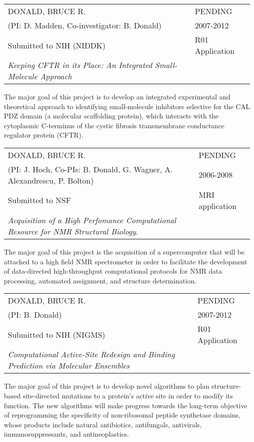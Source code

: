 \documentclass[11pt]{nih}
\begin{document}
\myhrule
\noindent \begin{tabular}{ll} DONALD, BRUCE R.& PENDING \\
 (PI: D. Madden, Co-investigator: B. Donald) & 2007-2012\\
Submitted to NIH (NIDDK) & R01 Application \\
 {\em Keeping CFTR in its
Place: An Integrated Small-Molecule Approach}\\
\end{tabular}

The major goal of this project is to develop an integrated
experimental and theoretical approach to identifying small-molecule
inhibitors selective for the CAL PDZ domain (a molecular scaffolding
protein), which interacts with the cytoplasmic C-terminus of the
cystic fibrosis transmembrane conductance regulator protein (CFTR).


\myhrule
\noindent \begin{tabular}{ll} DONALD, BRUCE R.& PENDING \\
 (PI: J. Hoch, Co-PIs: B. Donald, G. Wagner, A. Alexandrescu,
 P. Bolton) & 2006-2008\\
Submitted to NSF & MRI application \\
{\em	Acquisition of a High Perfomance Computational
Resource for NMR Structural Biology}.&\\
\end{tabular}

The major goal of this project is the acquisition of a supercomputer
that will be attached to a high field NMR spectrometer in order to
facilitate the development of data-directed high-throughput
computational protocols for NMR data processing, automated assignment,
and structure determination.

\myhrule

\noindent \begin{tabular}{ll} DONALD, BRUCE R.& PENDING \\
 (PI: B. Donald) & 2007-2012\\
Submitted to NIH (NIGMS) & R01 Application \\
 {\em Computational Active-Site Redesign and Binding Prediction via Molecular Ensembles}\\
\end{tabular}

The major goal of this project is to develop novel algorithms to plan
structure-based site-directed mutations to a protein's active site in
order to modify its function.  The new algorithms will make progress
towards the long-term objective of reprogramming the specificity of
non-ribosomal peptide synthetase domains, whose products include
natural antibiotics, antifungals, antivirals, immunosuppressants, and
antineoplastics.


\myhrule
\end{document}
